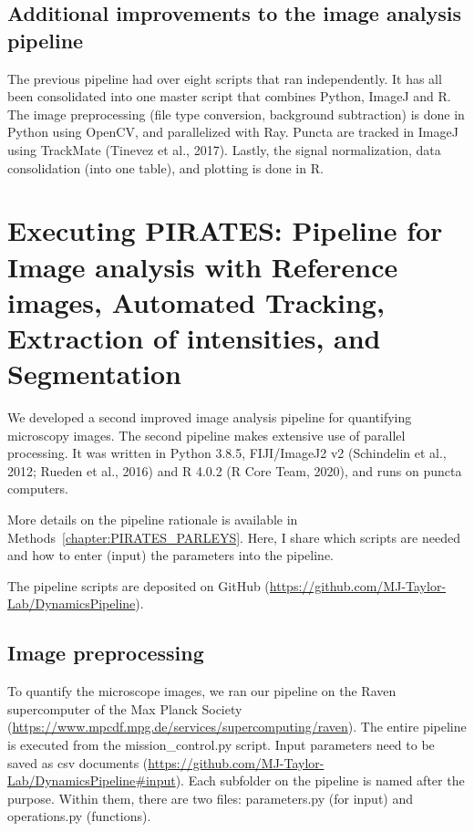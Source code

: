 \subsection{Additional improvements to the image analysis pipeline}
The previous pipeline had over eight scripts that ran independently. It has all been consolidated into one master script that combines Python, ImageJ and R. The image preprocessing (file type conversion, background subtraction) is done in Python using OpenCV, and parallelized with Ray. Puncta are tracked in ImageJ using TrackMate (Tinevez et al., 2017). Lastly, the signal normalization, data consolidation (into one table), and plotting is done in R.

\section{Executing PIRATES: Pipeline for Image analysis with Reference images, Automated Tracking, Extraction of intensities, and Segmentation}
\label{section:PIRATES}
We developed a second improved image analysis pipeline for quantifying microscopy images. The second pipeline makes extensive use of parallel processing. It was written in Python 3.8.5, FIJI/ImageJ2 v2 (Schindelin et al., 2012; Rueden et al., 2016) and R 4.0.2 (R Core Team, 2020), and runs on puncta computers.

More details on the pipeline rationale is available in Methods~\ref{chapter:PIRATES_PARLEYS}. Here, I share which scripts are needed and how to enter (input) the parameters into the pipeline.

The pipeline scripts are deposited on GitHub (\url{https://github.com/MJ-Taylor-Lab/DynamicsPipeline}). 



\subsection{Image preprocessing}
To quantify the microscope images, we ran our pipeline on the Raven supercomputer of the Max Planck Society (\url{https://www.mpcdf.mpg.de/services/supercomputing/raven}). The entire pipeline is executed from the mission\_control.py script. Input parameters need to be saved as csv documents (\url{https://github.com/MJ-Taylor-Lab/DynamicsPipeline\#input}). Each subfolder on the pipeline is named after the purpose. Within them, there are two files: parameters.py (for input) and operations.py (functions).

